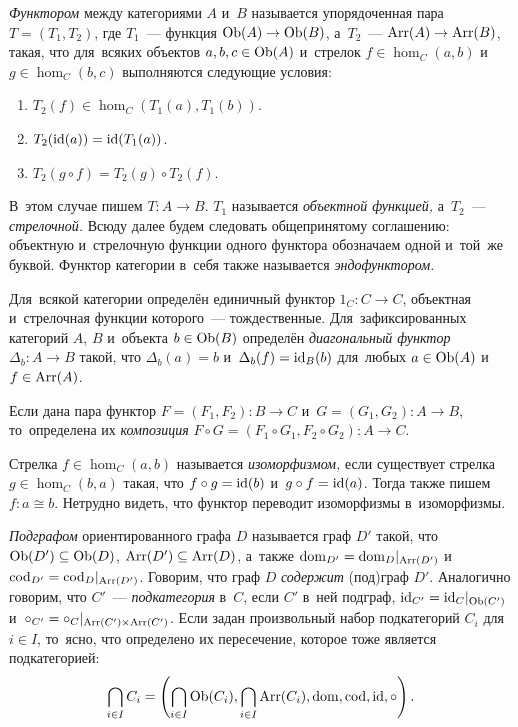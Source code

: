 \documentclass[a4paper,oneside]{article}
\begin{document}
\textit{Функтором} между категориями $A$ и~$B$ называется упорядоченная пара $T = (T_1, T_2)$,
где $T_1$~— функция $\mathrm{Ob}(A) \rightarrow \mathrm{Ob}(B)$, а~$T_2$~— $\mathrm{Arr}(A) \rightarrow \mathrm{Arr}(B)$,
такая, что для~всяких объектов $a, b, c \in \mathrm{Ob}(A)$ и~стрелок $f \in \hom_C(a, b)$ и~$g \in \hom_C(b, c)$ выполняются
следующие условия:
\begin{enumerate}
    \item $T_2(f) \in \hom_C(T_1(a), T_1(b))$.
    \item $T_2(\mathrm{id}(a)) = \mathrm{id}(T_1(a))$.
    \item $T_2(g \circ f) = T_2(g) \circ T_2(f)$.
\end{enumerate}

В~этом случае пишем $T : A \rightarrow B$. $T_1$ называется \textit{объектной функцией,} а~$T_2$~— \textit{стрелочной.}
Всюду далее будем следовать общепринятому соглашению: объектную и~стрелочную функции одного функтора обозначаем одной и~той~же буквой.
Функтор категории в~себя также называется \textit{эндофунктором.}

Для~всякой категории определён единичный функтор $1_C : C \rightarrow C$, объектная и~стрелочная функции которого~— тождественные.
Для~зафиксированных категорий $A$, $B$ и~объекта $b \in \mathrm{Ob}(B)$ определён \textit{диагональный функтор} $\Delta_b : A \rightarrow B$
такой, что $\Delta_b(a) = b$ и~$\Delta_b(f) = \mathrm{id}_B(b)$ для~любых $a \in \mathrm{Ob}(A)$ и~$f \in \mathrm{Arr}(A)$.

Если дана пара функтор $F = (F_1, F_2) : B \rightarrow C$ и~$G = (G_1, G_2) : A \rightarrow B$,
то~определена их \textit{композиция} $F \circ G = (F_1 \circ G_1, F_2 \circ G_2) : A \rightarrow C$.

Стрелка $f \in \hom_C(a, b)$ называется \textit{изоморфизмом,} если существует стрелка $g \in \hom_C(b, a)$
такая, что $f \circ g = \mathrm{id}(b)$ и~$g \circ f = \mathrm{id}(a)$. Тогда также пишем $f : a \cong b$.
Нетрудно видеть, что функтор переводит изоморфизмы в~изоморфизмы.

\textit{Подграфом} ориентированного графа $D$ называется граф $D'$ такой, что $\mathrm{Ob}(D') \subseteq \mathrm{Ob}(D)$, $\mathrm{Arr}(D') \subseteq \mathrm{Arr}(D)$,
а~также $\mathrm{dom}_{D'} = \mathrm{dom}_{D} |_{\mathrm{Arr}(D')}$ и~$\mathrm{cod}_{D'} = \mathrm{cod}_{D} |_{\mathrm{Arr}(D')}$.
Говорим, что граф $D$ \textit{содержит} (под)граф $D'$.
Аналогично говорим, что $C'$~— \textit{подкатегория} в~$C$, если $C'$ в~ней подграф, $\mathrm{id}_{C'} = \mathrm{id}_{C} |_{\mathrm{Ob}(C')}$
и~$\circ_{C'} = \circ_{C} |_{\mathrm{Arr}(C') \times \mathrm{Arr}(C')}$.
Если задан произвольный набор подкатегорий $C_i$ для~$i \in I$, то~ясно, что определено их пересечение, которое тоже является подкатегорией:
$$
    \bigcap\limits_{i \in I} C_i = \left( \bigcap\limits_{i \in I} \mathrm{Ob}(C_i), \bigcap\limits_{i \in I} \mathrm{Arr}(C_i), \mathrm{dom}, \mathrm{cod}, \mathrm{id}, \circ \right).
$$
\end{document}
